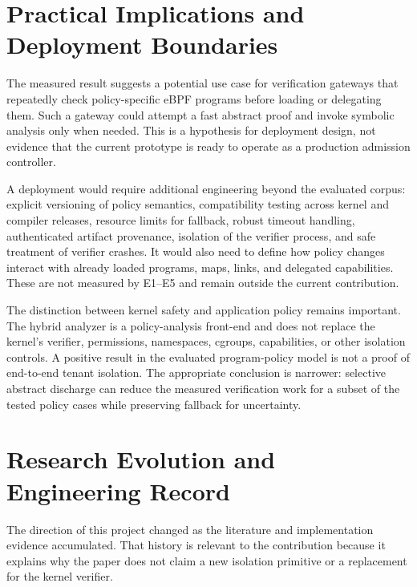 \section{Practical Implications and Deployment Boundaries}
The measured result suggests a potential use case for verification gateways that repeatedly check policy-specific eBPF programs before loading or delegating them. Such a gateway could attempt a fast abstract proof and invoke symbolic analysis only when needed. This is a hypothesis for deployment design, not evidence that the current prototype is ready to operate as a production admission controller.

A deployment would require additional engineering beyond the evaluated corpus: explicit versioning of policy semantics, compatibility testing across kernel and compiler releases, resource limits for fallback, robust timeout handling, authenticated artifact provenance, isolation of the verifier process, and safe treatment of verifier crashes. It would also need to define how policy changes interact with already loaded programs, maps, links, and delegated capabilities. These are not measured by E1--E5 and remain outside the current contribution.

The distinction between kernel safety and application policy remains important. The hybrid analyzer is a policy-analysis front-end and does not replace the kernel's verifier, permissions, namespaces, cgroups, capabilities, or other isolation controls. A positive result in the evaluated program-policy model is not a proof of end-to-end tenant isolation. The appropriate conclusion is narrower: selective abstract discharge can reduce the measured verification work for a subset of the tested policy cases while preserving fallback for uncertainty.


\section{Research Evolution and Engineering Record}
The direction of this project changed as the literature and implementation evidence accumulated. That history is relevant to the contribution because it explains why the paper does not claim a new isolation primitive or a replacement for the kernel verifier.

